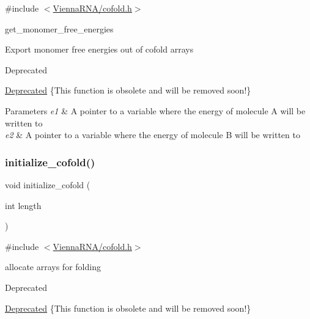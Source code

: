 {\ttfamily \#include $<$\mbox{\hyperlink{cofold_8h}{Vienna\+R\+N\+A/cofold.\+h}}$>$}



get\+\_\+monomer\+\_\+free\+\_\+energies 

Export monomer free energies out of cofold arrays \begin{DoxyRefDesc}{Deprecated}
\item[\mbox{\hyperlink{deprecated__deprecated000037}{Deprecated}}]\{This function is obsolete and will be removed soon!\}\end{DoxyRefDesc}



\begin{DoxyParams}{Parameters}
{\em e1} & A pointer to a variable where the energy of molecule A will be written to \\
\hline
{\em e2} & A pointer to a variable where the energy of molecule B will be written to \\
\hline
\end{DoxyParams}
\mbox{\label{group__mfe__global__deprecated_gafee0c32208aa2ac97338b6e3fbad7fa5}} 
\subsubsection{\texorpdfstring{initialize\_cofold()}{initialize\_cofold()}}
{\footnotesize\ttfamily void initialize\+\_\+cofold (\begin{DoxyParamCaption}\item[{int}]{length }\end{DoxyParamCaption})}



{\ttfamily \#include $<$\mbox{\hyperlink{cofold_8h}{Vienna\+R\+N\+A/cofold.\+h}}$>$}

allocate arrays for folding \begin{DoxyRefDesc}{Deprecated}
\item[\mbox{\hyperlink{deprecated__deprecated000038}{Deprecated}}]\{This function is obsolete and will be removed soon!\}\end{DoxyRefDesc}
\mbox{\label{group__mfe__global__deprecated_ga2bc41df5d71fee6fd8da9904ee65d8fb}} 
